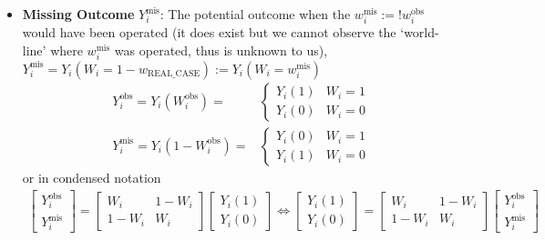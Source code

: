 \begin{itemize}[topsep=2pt,itemsep=0pt]
        \item \textbf{Missing Outcome} $ Y_i^{\mathrm{mis} } $: The potential outcome when the $ w_i^\mathrm{mis}:= !w_i^\mathrm{obs}  $ would have been operated (it does exist but we cannot observe the `world-line' where $ w^{\mathrm{mis} }_i $ was operated, thus is unknown to us), $ Y_i^{\mathrm{mis} }=Y_i(W_i=1-w_\mathrm{REAL\_CASE}):=Y_i(W_i=w_i^{\mathrm{mis} }) $ 
        \begin{align}
            Y^\mathrm{obs} _i=Y_i(W_i^\mathrm{obs} )=&\begin{cases}
                Y_i(1)&W_i=1\\
                Y_i(0)&W_i=0
            \end{cases}\\
            Y^{\mathrm{mis} }_i=Y_i(1-W_i^\mathrm{obs} )=&\begin{cases}
                Y_i(0)&W_i=1\\
                Y_i(1)&W_i=0
            \end{cases}
        \end{align}
        or in condensed notation
        \begin{align}
            \begin{bmatrix}
                Y^\mathrm{obs}_i\\
                Y^\mathrm{mis}_i  
            \end{bmatrix} = \begin{bmatrix}
                W_i&1-W_i\\
                1-W_i&W_i
            \end{bmatrix}\begin{bmatrix}
                Y_i(1)\\ Y_i(0)
            \end{bmatrix}\Leftrightarrow\begin{bmatrix}
                Y_i(1)\\ Y_i(0)
            \end{bmatrix} = \begin{bmatrix}
                W_i&1-W_i\\
                1-W_i&W_i
            \end{bmatrix}\begin{bmatrix}
                Y^\mathrm{obs}_i\\
                Y^\mathrm{mis}_i  
            \end{bmatrix}
        \end{align}
        

\end{itemize}
